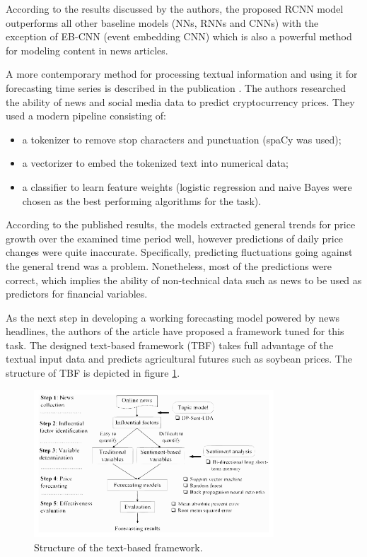 \documentclass[3p,times,procedia]{elsarticle}
\begin{document}
According to the results discussed by the authors, the proposed RCNN model outperforms all other baseline models (NNs, RNNs and CNNs) with the exception of EB-CNN (event embedding CNN) which is also a powerful method for modeling content in news articles.

\newpage

A more contemporary method for processing textual information and using it for forecasting time series is described in the publication \cite{lamon2017cryptocurrency}. The authors researched the ability of news and social media data to predict cryptocurrency prices. They used a modern pipeline consisting of:
\begin{itemize}
	\item a tokenizer to remove stop characters and punctuation (spaCy was used);
	\item a vectorizer to embed the tokenized text into numerical data;
	\item a classifier to learn feature weights (logistic regression and naive Bayes were chosen as the best performing algorithms for the task).
\end{itemize}
According to the published results, the models extracted general trends for price growth over the examined time period well, however predictions of daily price changes were quite inaccurate. Specifically, predicting fluctuations going against the general trend was a problem. Nonetheless, most of the predictions were correct, which implies the ability of non-technical data such as news to be used as predictors for financial variables.

As the next step in developing a working forecasting model powered by news headlines, the authors of the article \cite{li2022novel} have proposed a framework tuned for this task. The designed text-based framework (TBF) takes full advantage of the textual input data and predicts agricultural futures such as soybean prices. The structure of TBF is depicted in figure \ref{fig:gr6}.
\begin{figure}[h!]\vspace*{4pt}
	\centerline{\includegraphics[width=0.8\textwidth]{./visuals/gr6.pdf}}
\caption{Structure of the text-based framework.}
\label{fig:gr6}
\end{figure}
\end{document}
